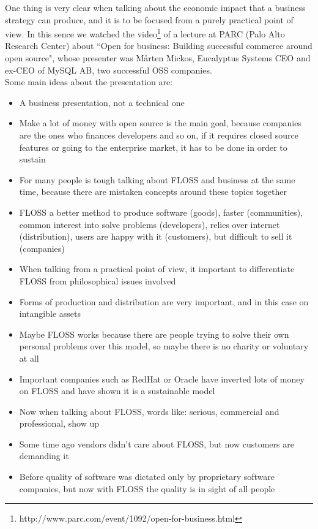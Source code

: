 One thing is very clear when talking about the economic impact that a business strategy can produce, and it is to be focused from a purely practical point of view. In this sence we watched the video\footnote{http://www.parc.com/event/1092/open-for-business.html} of a lecture at PARC (Palo Alto Research Center) about \textquotedblleft Open for business: Building successful commerce around open source", whose presenter was M\aa rten Mickos, Eucalyptus Systems CEO and ex-CEO of MySQL AB, two successful OSS companies.\\

Some main ideas about the presentation are:

\begin{itemize}
\item A business presentation, not a technical one
\item Make a lot of money with open source is the main goal, because companies are the ones who finances developers and so on, if it requires closed source features or going to the enterprise market, it has to be done in order to sustain
\item For many people is tough talking about FLOSS and business at the same time, because there are mistaken concepts around these topics together
\item FLOSS a better method to produce software (goods), faster (communities), common interest into solve problems (developers), relies over internet (distribution), users are happy with it (customers), but difficult to sell it (companies)
\item When talking from a practical point of view, it important to differentiate FLOSS from philosophical issues involved
\item Forms of production and distribution are very important, and in this case on intangible assets
\item Maybe FLOSS works because there are people trying to solve their own personal problems over this model, so maybe there is no charity or voluntary at all
\item Important companies such as RedHat or Oracle have inverted lots of money on FLOSS and have shown it is a sustainable model
\item Now when talking about FLOSS, words like: serious, commercial and professional, show up
\item Some time ago vendors didn't care about FLOSS, but now customers are demanding it
\item Before quality of software was dictated only by proprietary software companies, but now with FLOSS the quality is in sight of all people

\end{itemize}
